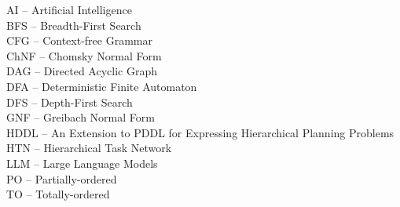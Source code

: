 \documentclass[12pt,a4paper]{report}
\begin{document}



\tableofcontents











\listoffigures


\noindent
AI – Artificial Intelligence \\
BFS – Breadth-First Search \\
CFG – Context-free Grammar \\
ChNF – Chomsky Normal Form \\
DAG – Directed Acyclic Graph \\
DFA – Deterministic Finite Automaton \\
DFS – Depth-First Search \\
GNF – Greibach Normal Form \\
HDDL – An Extension to PDDL for Expressing Hierarchical Planning Problems \\
HTN – Hierarchical Task Network \\
LLM – Large Language Models \\
PO – Partially-ordered \\
TO – Totally-ordered

\ifx\ThesisType\TypePhD
{}
\fi

\appendix
\end{document}
